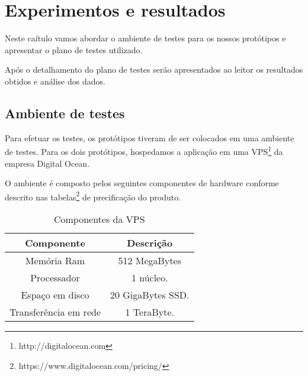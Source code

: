 
\chapter{Experimentos e resultados}
\label{experimentos-resultados}

\vspace{-1.9cm}


 Neste caítulo vamos abordar o ambiente de testes para os nossos protótipos e apresentar 
 o plano de testes utilizado.
 
 Após o detalhamento do plano de testes serão apresentados ao leitor os resultados obtidos e análise dos dados.

\section{Ambiente de testes}
\label{ambientedetestes}

  Para efetuar os testes, os protótipos tiveram de ser colocados em uma ambiente de testes. 
  Para os dois protótipos, hospedamos a aplicação em uma VPS\footnote{http://digitalocean.com} da empresa Digital Ocean.
  
  O ambiente é composto pelos seguintes componentes de hardware conforme descrito nas tabelas\footnote{https://www.digitalocean.com/pricing/}
  de precificação do produto.
  
  \begin{table}[H]
    \centering
    \footnotesize
    \setlength{\abovecaptionskip}{0pt}
    \setlength{\belowcaptionskip}{0pt}
    \caption[Componentes da VPS]{Componentes da VPS}
    \label{tab:components-digital-ocean-vps}
    \begin{tabular}{c|c}
      \hline \hline
      Componente  &	Descrição \\
      \hline \hline
      Memória Ram & 512 MegaBytes \\
      Processador & 1 núcleo. \\
      Espaço em disco & 20 GigaBytes \ac{SSD}. \\
      Transferência em rede & 1 TeraByte. \\
      \hline \hline
    \end{tabular}
  \end{table}

